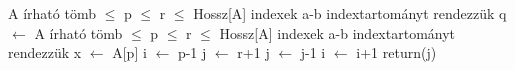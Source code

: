 \documentclass{article}
\begin{document}
\begin{algorithmic}[2]
\Require A írható tömb
 $\leq$ p $\leq$ r $\leq$ Hossz[A] indexek
\Ensure a-b indextartományt rendezzük
\State       q $\leftarrow$ 
\State{}
\State{}
\EndIf
\EndProcedure
\Statex
\Statex
{}
\Require A írható tömb
 $\leq$ p $\leq$ r $\leq$ Hossz[A] indexek
\Ensure a-b indextartományt rendezzük
\State    x $\leftarrow$ A[p]
\State    i $\leftarrow$ p-1
\State    j $\leftarrow$ r+1
        \Repeat
\State            j $\leftarrow$ j-1
        \Repeat
\State            i $\leftarrow$ i+1
        \Else 
\State            return(j)
		\EndIf
\EndWhile
\EndFunction
\end{algorithmic}
\end{document}
